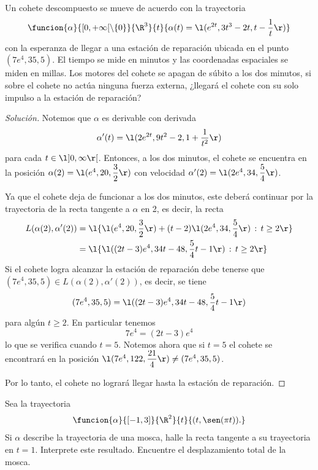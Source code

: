 \documentclass[a4,11pt]{aleph-notas}
\begin{document}
\begin{ejer}
Un cohete descompuesto se mueve de acuerdo con la trayectoria
\[
\funcion{\alpha}{[0,+\infty[\setminus \lbrace 0 \rbrace}{\R^3}
{t}{\alpha(t)=\l(e^{2t},3t^3-2t,t-\dfrac{1}{t}\r)}
\]
con la esperanza de llegar a una estación de reparación ubicada en el punto $(7e^4,35,5)$. El tiempo se mide en minutos y las coordenadas espaciales se miden en millas. Los motores del cohete se apagan de súbito a los dos minutos, si sobre el cohete no actúa ninguna fuerza externa, ¿llegará el cohete con su solo impulso a la estación de reparación?
\end{ejer}

\begin{proof}[Solución]
Notemos que $\alpha$ es derivable con derivada
\[
\alpha'(t) = \l(2e^{2t},9t^2-2,1+\dfrac{1}{t^2}\r)
\]
para cada $t\in \l] 0,\infty \r[ $. Entonces, a los dos minutos, el cohete se encuentra en la posición $\alpha(2)=\l(e^4,20,\dfrac{3}{2}\r)$ con velocidad $\alpha'(2)=\l(2e^4,34,\dfrac{5}{4}\r)$. 

Ya que el cohete deja de funcionar a los dos minutos, este deberá continuar por la trayectoria de la recta tangente a $\alpha$ en 2, es decir, la recta
\begin{align*}
    L(\alpha(2),\alpha'(2)) &= \l\{\l(e^4,20,\dfrac{3}{2}\r) + (t-2)\l(2e^4,34,\dfrac{5}{4}\r)\,:\,t \geq 2\r\}\\
    &= \l\{\l((2t-3)e^4, 34t-48,\dfrac{5}{4}t-1\r)\,:\,t \geq 2\r\}\\
\end{align*}
Si el cohete logra alcanzar la estación de reparación debe tenerse que $(7e^4,35,5)\in L(\alpha(2),\alpha'(2))$, es decir, se tiene
\[
(7e^4,35,5) = \l((2t-3)e^4, 34t-48,\dfrac{5}{4}t-1\r)
\]
para algún $t \geq 2$. En particular tenemos
\[
7e^4 = (2t-3)e^4
\]
lo que se verifica cuando $t=5$. Notemos ahora que si $t=5$ el cohete se encontrará en la posición $\l(7e^4,122,\dfrac{21}{4}\r)\neq(7e^4,35,5)$.

Por lo tanto, el cohete no logrará llegar hasta la estación de reparación.
\end{proof}

\begin{ejer}
Sea la trayectoria 
    \[
        \funcion{\alpha}{[-1,3]}{\R^2}{t}{(t,\sen(\pi t)).}
    \]
    Si $\alpha$ describe la trayectoria de una mosca, halle la recta tangente a su trayectoria en $t=1$. Interprete este resultado. Encuentre el desplazamiento total de la mosca.
\end{ejer}
\end{document}
